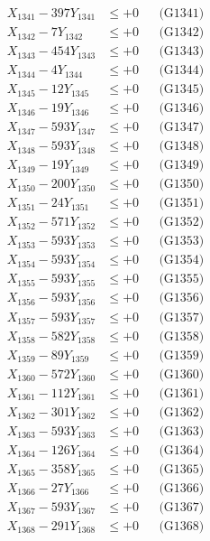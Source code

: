 \documentclass[a4paper,10pt]{article}
\begin{document}
{\begin{align}
\allowbreak
X_{1341} - 397Y_{1341} &\leq +0 && \text{(G1341)} \\
X_{1342} - 7Y_{1342} &\leq +0 && \text{(G1342)} \\
X_{1343} - 454Y_{1343} &\leq +0 && \text{(G1343)} \\
X_{1344} - 4Y_{1344} &\leq +0 && \text{(G1344)} \\
X_{1345} - 12Y_{1345} &\leq +0 && \text{(G1345)} \\
X_{1346} - 19Y_{1346} &\leq +0 && \text{(G1346)} \\
X_{1347} - 593Y_{1347} &\leq +0 && \text{(G1347)} \\
X_{1348} - 593Y_{1348} &\leq +0 && \text{(G1348)} \\
X_{1349} - 19Y_{1349} &\leq +0 && \text{(G1349)} \\
X_{1350} - 200Y_{1350} &\leq +0 && \text{(G1350)} \\
\allowbreak
X_{1351} - 24Y_{1351} &\leq +0 && \text{(G1351)} \\
X_{1352} - 571Y_{1352} &\leq +0 && \text{(G1352)} \\
X_{1353} - 593Y_{1353} &\leq +0 && \text{(G1353)} \\
X_{1354} - 593Y_{1354} &\leq +0 && \text{(G1354)} \\
X_{1355} - 593Y_{1355} &\leq +0 && \text{(G1355)} \\
X_{1356} - 593Y_{1356} &\leq +0 && \text{(G1356)} \\
X_{1357} - 593Y_{1357} &\leq +0 && \text{(G1357)} \\
X_{1358} - 582Y_{1358} &\leq +0 && \text{(G1358)} \\
X_{1359} - 89Y_{1359} &\leq +0 && \text{(G1359)} \\
X_{1360} - 572Y_{1360} &\leq +0 && \text{(G1360)} \\
\allowbreak
X_{1361} - 112Y_{1361} &\leq +0 && \text{(G1361)} \\
X_{1362} - 301Y_{1362} &\leq +0 && \text{(G1362)} \\
X_{1363} - 593Y_{1363} &\leq +0 && \text{(G1363)} \\
X_{1364} - 126Y_{1364} &\leq +0 && \text{(G1364)} \\
X_{1365} - 358Y_{1365} &\leq +0 && \text{(G1365)} \\
X_{1366} - 27Y_{1366} &\leq +0 && \text{(G1366)} \\
X_{1367} - 593Y_{1367} &\leq +0 && \text{(G1367)} \\
X_{1368} - 291Y_{1368} &\leq +0 && \text{(G1368)} \\

\end{align}}
\end{document}
